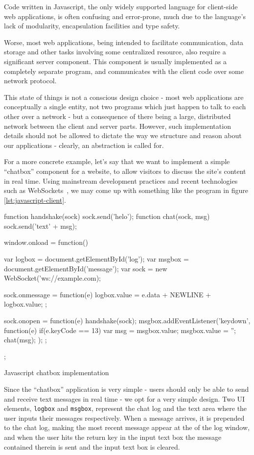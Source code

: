 \documentclass[preprint]{sigplanconf}
\begin{document}
Code written in Javascript, the only widely supported language for client-side
web applications, is often confusing and error-prone, much due to the
language's lack of modularity, encapsulation facilities and type safety.

Worse, most web applications, being intended to facilitate communication, data
storage and other tasks involving some centralized resource, also require a
significant server component. This component is usually implemented as a
completely separate program, and communicates with the client code over some
network protocol.

This state of things is not a conscious design choice - most web applications
are conceptually a single entity, not two programs which just happen to talk
to each other over a network - but a consequence of there being a large,
distributed network between the client and server parts.
However, such implementation details should not be allowed to dictate the way
we structure and reason about our applications - clearly, an abstraction is
called for.

For a more concrete example, let's say that we want to implement a simple
``chatbox'' component for a website, to allow visitors to discuss the site's
content in real time. Using mainstream development practices and recent
technologies such as WebSockets\ \cite{websockets}, we may come up with
something like the program in figure \ref{lst:javascript-client}.

\begin{listingfloat}
\begin{code}
function handshake(sock) {sock.send('helo');}
function chat(sock, msg) {sock.send('text' + msg);}

window.onload = function() {
  var logbox = document.getElementById('log');
  var msgbox = document.getElementById('message');
  var sock = new WebSocket('ws://example.com);

  sock.onmessage = function(e) {
    logbox.value = e.data + NEWLINE + logbox.value;
  };

  sock.onopen = function(e) {
    handshake(sock);
    msgbox.addEventListener('keydown', function(e) {
      if(e.keyCode == 13) {
        var msg = msgbox.value;
        msgbox.value = '';
        chat(msg);
      }
    });
  };
};
\end{code}
\caption{Javascript chatbox implementation}
\label{lst:javascript-client}
\end{listingfloat}

Since the ``chatbox'' application is very simple - users should only be able to
send and receive text messages in real time - we opt for a very simple
design. Two UI elements, \lstinline!logbox! and \lstinline!msgbox!, represent
the chat log and the text area where the user inputs their messages
respectively. When a message arrives, it is prepended to the chat log, making
the most recent message appear at the of the log window, and when the user hits
the return key in the input text box the message contained therein is sent and
the input text box is cleared.
\end{document}
